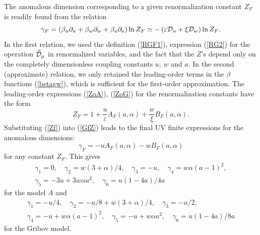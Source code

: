 \documentclass[12pt]{article}
\def\Dm{\widetilde{\cal D}_{\mu}}
\def\D{{\cal D}}
\begin{document}
The anomalous dimension corresponding to a given renormalization constant
$Z_{F}$ is readily found from the relation
\begin{equation}
\gamma_{F} = \left( \beta_{u}\partial_{u}+\beta_{w}\partial_{w}
+\beta_{a}\partial_{a} \right)
\ln Z_{F} \simeq  - \left(\varepsilon\D_{u}+\xi\D_{w}\right) \ln Z_{F}.
\label{GfZ}
\end{equation}
In the first relation, we used the definition (\ref{RGF1}), expression
(\ref{RG2}) for the operation $\Dm$ in renormalized variables, and the
fact that the $Z$'s depend only on the completely dimensionless coupling
constants $u$, $w$ and $a$. In the second (approximate) relation, we only
retained the leading-order terms in the $\beta$ functions (\ref{betagw}),
which is sufficient for the first-order approximation. The leading-order
expressions (\ref{ZoA}), (\ref{ZoG}) for the renormalization constants have
the form
\begin{equation}
Z_{F} = 1 + \frac{u}{\varepsilon} A_{F}(a,\alpha) + \frac{w}{\xi} B_{F}(a,\alpha).
\label{Zf}
\end{equation}
Substituting (\ref{Zf}) into (\ref{GfZ}) leads to the final UV finite
expressions for the anomalous dimensions:
\begin{equation}
\gamma_{F} = - u A_{F}(a,\alpha) - w B_{F}(a,\alpha)
\label{gift}
\end{equation}
for any constant $Z_{F}$. This gives
\begin{eqnarray}
\gamma_{1} = 0, \quad \gamma_{2} = w (3+\alpha)/4, \quad
\gamma_{3} = -u , \quad \gamma_{4} =w \alpha (a-1)^{2} , \nonumber \\
\gamma_{5} =  -3u +3 w \alpha a^{2}, \quad
\gamma_{6} =u(1-4a)/4a
\label{anomA}
\end{eqnarray}
for the model {\it A} and
\begin{eqnarray}
\gamma_{1} = -u/4 , \quad \gamma_{2} = -u/8 + w (3+\alpha)/4, \quad
\gamma_{3} = -u/2 , \nonumber \\
\gamma_{4} = -u + w \alpha (a-1)^{2}, \quad
\gamma_{5} = -u + w \alpha a^{2}, \quad
\gamma_{6} =u(1-4a)/8a
\label{anomG}
\end{eqnarray}
for the Gribov model.
\end{document}
